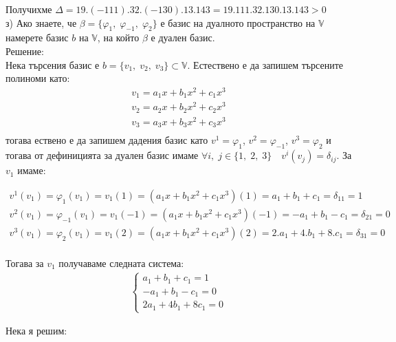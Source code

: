 \documentclass[12pt]{article}
\newcommand{\V}{\mathbb{V}}
\begin{document}
Получихме $\Delta = 19.(-111).32.(-130).13.143 = 19.111.32.130.13.143 > 0$ \\

з) Ако знаете, че $\beta = \{\varphi_1, \; \varphi_{-1}, \; \varphi_2\}$ е базис на дуалното пространство на $\V$
намерете базис $b$ на $\V$, на който $\beta$ е дуален базис. \\

Решение: \\

Нека търсения базис е $b = \{v_1, \; v_2, \; v_3\} \subset \V$.
Естествено е да запишем търсените полиноми като:
\begin{align*}
    v_1 = a_1x +b_1x^2 + c_1x^3 \\
    v_2 = a_2x +b_2x^2 + c_2x^3 \\
    v_3 = a_3x +b_3x^2 + c_3x^3 \\
\end{align*}
тогава ествено е да запишем дадения базис като $v^1 = \varphi_1$, $v^2 = \varphi_{-1}$, $v^3 = \varphi_2$
и тогава от дефиницията за дуален базис имаме $\forall i, \; j \in \{1, \; 2, \; 3\} \quad v^i(v_j) = \delta_{ij}$.
За $v_1$ имаме: 

\begin{align*}
    v^1(v_1) = \varphi_1(v_1) = v_1(1) = (a_1x +b_1x^2 + c_1x^3)(1) = a_1 + b_1 + c_1 = \delta_{11} = 1 \\
    v^2(v_1) = \varphi_{-1}(v_1) = v_1(-1) = (a_1x +b_1x^2 + c_1x^3)(-1) = -a_1 + b_1 - c_1 = \delta_{21} = 0 \\
    v^3(v_1) = \varphi_2(v_1) = v_1(2) = (a_1x +b_1x^2 + c_1x^3)(2) = 2.a_1 + 4.b_1 + 8.c_1 = \delta_{31} = 0
\end{align*} \\

Тогава за $v_1$ получаваме следната система:
\begin{align*}
    \begin{cases}
         a_1 +  b_1 + c_1 = 1 \\
        -a_1 +  b_1 -  c_1 = 0 \\
        2a_1 + 4b_1 + 8c_1 = 0
    \end{cases}
\end{align*}

Нека я решим: \\
\end{document}
